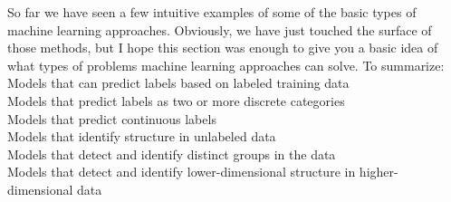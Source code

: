 \documentclass{tufte-handout}
\begin{document}
So far we have seen a few intuitive examples of some of the basic types of machine learning approaches. Obviously, we have just touched the surface of those methods, but I hope this section was enough to give you a basic idea of what types of problems machine learning approaches can solve.
To summarize:
\\Models that can predict labels based on labeled training data
\\Models that predict labels as two or more discrete categories
\\Models that predict continuous labels
\\Models that identify structure in unlabeled data
\\Models that detect and identify distinct groups in the data
\\Models that detect and identify lower-dimensional structure in higher- dimensional data



\end{document}
